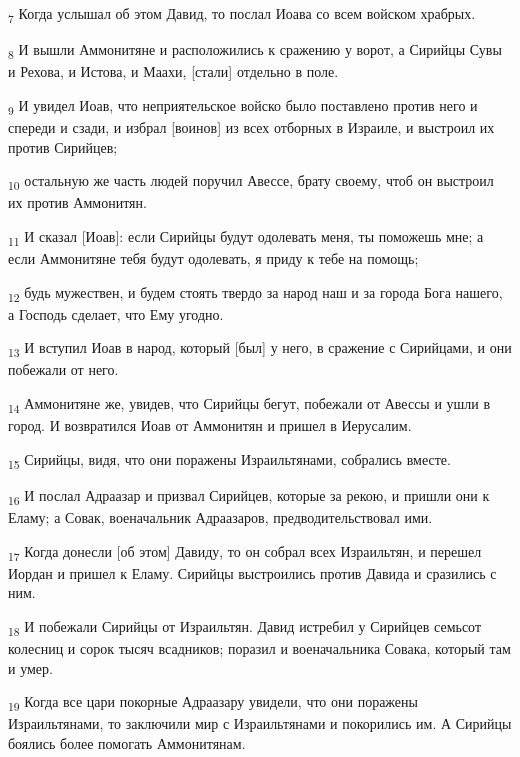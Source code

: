 \begin{tcolorbox}
\textsubscript{7} Когда услышал об этом Давид, то послал Иоава со всем войском храбрых.
\end{tcolorbox}
\begin{tcolorbox}
\textsubscript{8} И вышли Аммонитяне и расположились к сражению у ворот, а Сирийцы Сувы и Рехова, и Истова, и Маахи, [стали] отдельно в поле.
\end{tcolorbox}
\begin{tcolorbox}
\textsubscript{9} И увидел Иоав, что неприятельское войско было поставлено против него и спереди и сзади, и избрал [воинов] из всех отборных в Израиле, и выстроил их против Сирийцев;
\end{tcolorbox}
\begin{tcolorbox}
\textsubscript{10} остальную же часть людей поручил Авессе, брату своему, чтоб он выстроил их против Аммонитян.
\end{tcolorbox}
\begin{tcolorbox}
\textsubscript{11} И сказал [Иоав]: если Сирийцы будут одолевать меня, ты поможешь мне; а если Аммонитяне тебя будут одолевать, я приду к тебе на помощь;
\end{tcolorbox}
\begin{tcolorbox}
\textsubscript{12} будь мужествен, и будем стоять твердо за народ наш и за города Бога нашего, а Господь сделает, что Ему угодно.
\end{tcolorbox}
\begin{tcolorbox}
\textsubscript{13} И вступил Иоав в народ, который [был] у него, в сражение с Сирийцами, и они побежали от него.
\end{tcolorbox}
\begin{tcolorbox}
\textsubscript{14} Аммонитяне же, увидев, что Сирийцы бегут, побежали от Авессы и ушли в город. И возвратился Иоав от Аммонитян и пришел в Иерусалим.
\end{tcolorbox}
\begin{tcolorbox}
\textsubscript{15} Сирийцы, видя, что они поражены Израильтянами, собрались вместе.
\end{tcolorbox}
\begin{tcolorbox}
\textsubscript{16} И послал Адраазар и призвал Сирийцев, которые за рекою, и пришли они к Еламу; а Совак, военачальник Адраазаров, предводительствовал ими.
\end{tcolorbox}
\begin{tcolorbox}
\textsubscript{17} Когда донесли [об этом] Давиду, то он собрал всех Израильтян, и перешел Иордан и пришел к Еламу. Сирийцы выстроились против Давида и сразились с ним.
\end{tcolorbox}
\begin{tcolorbox}
\textsubscript{18} И побежали Сирийцы от Израильтян. Давид истребил у Сирийцев семьсот колесниц и сорок тысяч всадников; поразил и военачальника Совака, который там и умер.
\end{tcolorbox}
\begin{tcolorbox}
\textsubscript{19} Когда все цари покорные Адраазару увидели, что они поражены Израильтянами, то заключили мир с Израильтянами и покорились им. А Сирийцы боялись более помогать Аммонитянам.
\end{tcolorbox}
